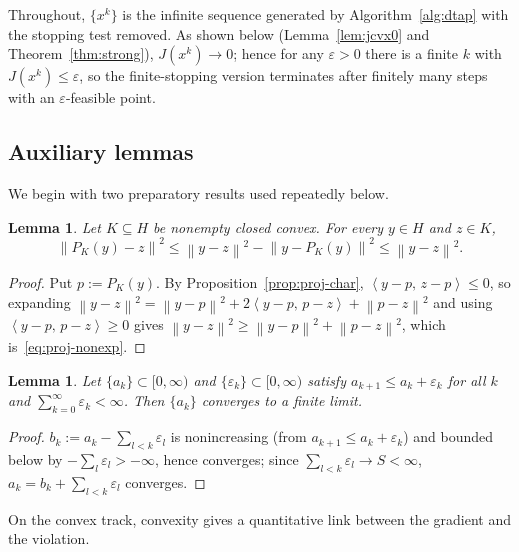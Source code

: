 \documentclass[]{interact}
\theoremstyle{plain}
\newtheorem{lemma}[theorem]{Lemma}
\theoremstyle{definition}
\theoremstyle{remark}
\newcommand{\norm}[1]{\left\lVert #1 \right\rVert}
\newcommand{\inner}[2]{\left\langle #1,\, #2 \right\rangle}
\begin{document}
Throughout, $\{x^k\}$ is the infinite sequence generated by Algorithm~\ref{alg:dtap} with
the stopping test removed. As shown below
(Lemma~\ref{lem:jcvx0} and Theorem~\ref{thm:strong}), $J(x^k)\to 0$; hence for any
$\varepsilon>0$ there is a finite $k$ with $J(x^k)\le\varepsilon$, so the finite-stopping
version terminates after finitely many steps with an $\varepsilon$-feasible point.

\subsection{Auxiliary lemmas}\label{ssec:aux}
We begin with two preparatory results used repeatedly below.

\begin{lemma}\label{lem:proj-nonexp}
Let $K\subseteq H$ be nonempty closed convex. For every $y\in H$ and $z\in K$,
\begin{equation}\label{eq:proj-nonexp}
\norm{P_K(y)-z}^2\le\norm{y-z}^2-\norm{y-P_K(y)}^2\le\norm{y-z}^2 .
\end{equation}
\end{lemma}
\begin{proof}
Put $p:=P_K(y)$. By Proposition~\ref{prop:proj-char}, $\inner{y-p}{z-p}\le0$, so expanding
$\norm{y-z}^2=\norm{y-p}^2+2\inner{y-p}{p-z}+\norm{p-z}^2$ and using $\inner{y-p}{p-z}\ge0$
gives $\norm{y-z}^2\ge\norm{y-p}^2+\norm{p-z}^2$, which is~\eqref{eq:proj-nonexp}.
\end{proof}

\begin{lemma}\label{lem:seq}
Let $\{a_k\}\subset[0,\infty)$ and $\{\varepsilon_k\}\subset[0,\infty)$ satisfy
$a_{k+1}\le a_k+\varepsilon_k$ for all $k$ and $\sum_{k=0}^\infty\varepsilon_k<\infty$.
Then $\{a_k\}$ converges to a finite limit.
\end{lemma}
\begin{proof}
$b_k:=a_k-\sum_{l<k}\varepsilon_l$ is nonincreasing (from $a_{k+1}\le a_k+\varepsilon_k$) and
bounded below by $-\sum_l\varepsilon_l>-\infty$, hence converges; since
$\sum_{l<k}\varepsilon_l\to S<\infty$, $a_k=b_k+\sum_{l<k}\varepsilon_l$ converges.
\end{proof}

On the convex track, convexity gives a quantitative link between the gradient and the
violation.
\end{document}
